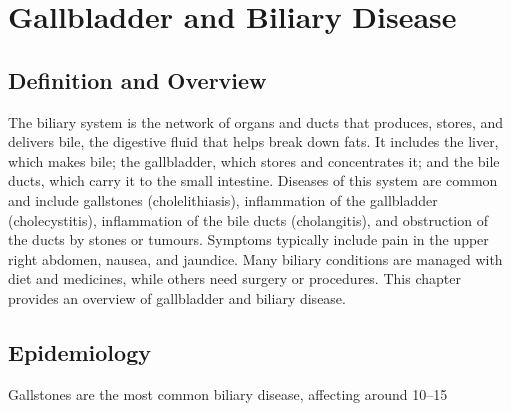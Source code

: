 \chapter{Gallbladder and Biliary Disease}

\section*{Definition and Overview}
The biliary system is the network of organs and ducts that produces, stores, and delivers bile, the digestive fluid that helps break down fats. It includes the liver, which makes bile; the gallbladder, which stores and concentrates it; and the bile ducts, which carry it to the small intestine. Diseases of this system are common and include gallstones (cholelithiasis), inflammation of the gallbladder (cholecystitis), inflammation of the bile ducts (cholangitis), and obstruction of the ducts by stones or tumours. Symptoms typically include pain in the upper right abdomen, nausea, and jaundice. Many biliary conditions are managed with diet and medicines, while others need surgery or procedures. This chapter provides an overview of gallbladder and biliary disease.

\section*{Epidemiology}
Gallstones are the most common biliary disease, affecting around 10--15%

